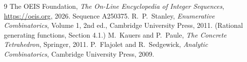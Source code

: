 \documentclass[11pt,a4paper]{article}
\theoremstyle{plain}
\theoremstyle{definition}
\begin{document}
\begin{thebibliography}{9}
 The OEIS Foundation, \emph{The On-Line Encyclopedia of Integer
Sequences}, \url{https://oeis.org}, 2026. Sequence A250375.
 R.~P.~Stanley, \emph{Enumerative Combinatorics}, Volume 1, 2nd ed.,
Cambridge University Press, 2011. (Rational generating functions, Section 4.1.)
 M.~Kauers and P.~Paule, \emph{The Concrete Tetrahedron}, Springer, 2011.
 P.~Flajolet and R.~Sedgewick, \emph{Analytic Combinatorics}, Cambridge
University Press, 2009.
\end{thebibliography}
\end{document}
